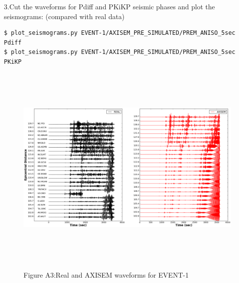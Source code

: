 \documentclass{article}
\begin{document}
3.Cut the waveforms for Pdiff and PKiKP seismic phases and plot the seismograms: 
(compared with real data)
\begin{verbatim}
$ plot_seismograms.py EVENT-1/AXISEM_PRE_SIMULATED/PREM_ANISO_5sec Pdiff
$ plot_seismograms.py EVENT-1/AXISEM_PRE_SIMULATED/PREM_ANISO_5sec PKiKP
\end{verbatim}

\begin{figure}
\includegraphics[width=497pt, height=287pt, keepaspectratio=true]{AXISEMTutorial-fig007.png}
\begin{center}
{\small{}Figure A3:Real and AXISEM waveforms for EVENT-1}
\end{center}
\end{figure}
\end{document}

